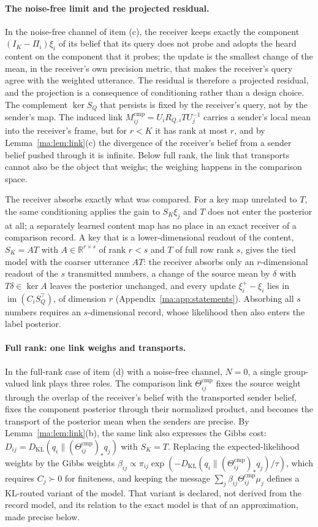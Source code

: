 \documentclass[11pt]{article}
\theoremstyle{definition}
\theoremstyle{remark}
\providecommand{\KL}{D_{\mathrm{KL}}}
\newcommand{\R}{\mathbb R}
\newcommand{\Thcmp}{\Theta^{\mathrm{cmp}}}
\newcommand{\Mcmp}{M^{\mathrm{cmp}}}
\newcommand{\im}{\operatorname{im}}
\begin{document}
\paragraph{The noise-free limit and the projected residual.}
In the noise-free channel of item (c), the receiver keeps exactly the component $(I_K-\Pi_i)\xi_i$ of its belief that its query does not probe and adopts the heard content on the component that it probes; the update is the smallest change of the mean, in the receiver's own precision metric, that makes the receiver's query agree with the weighted utterance. The residual is therefore a projected residual, and the projection is a consequence of conditioning rather than a design choice. The complement $\ker S_Q$ that persists is fixed by the receiver's query, not by the sender's map. The induced link $\Mcmp_{ij}=U_iR_{Q,i}TU_j^{-1}$ carries a sender's local mean into the receiver's frame, but for $r<K$ it has rank at most $r$, and by Lemma~\ref{ma:lem:link}(c) the divergence of the receiver's belief from a sender belief pushed through it is infinite. Below full rank, the link that transports cannot also be the object that weighs; the weighing happens in the comparison space.

The receiver absorbs exactly what was compared. For a key map unrelated to $T$, the same conditioning applies the gain to $S_K\xi_j$ and $T$ does not enter the posterior at all; a separately learned content map has no place in an exact receiver of a comparison record. A key that is a lower-dimensional readout of the content, $S_K=AT$ with $A\in\R^{r\times s}$ of rank $r<s$ and $T$ of full row rank $s$, gives the tied model with the coarser utterance $AT$: the receiver absorbs only an $r$-dimensional readout of the $s$ transmitted numbers, a change of the source mean by $\delta$ with $T\delta\in\ker A$ leaves the posterior unchanged, and every update $\xi_i^+-\xi_i$ lies in $\im(C_iS_Q^\top)$, of dimension $r$ (Appendix~\ref{ma:app:statements}). Absorbing all $s$ numbers requires an $s$-dimensional record, whose likelihood then also enters the label posterior.

\paragraph{Full rank: one link weighs and transports.}
In the full-rank case of item (d) with a noise-free channel, $N=0$, a single group-valued link plays three roles. The comparison link $\Thcmp_{ij}$ fixes the source weight through the overlap of the receiver's belief with the transported sender belief, fixes the component posterior through their normalized product, and becomes the transport of the posterior mean when the senders are precise. By Lemma~\ref{ma:lem:link}(b), the same link also expresses the Gibbs cost: $D_{ij}=\KL(q_i\|(\Thcmp_{ij})_*q_j)$ with $S_K=T$. Replacing the expected-likelihood weights by the Gibbs weights $\beta_{ij}\propto\pi_{ij}\exp(-\KL(q_i\|(\Thcmp_{ij})_*q_j)/\tau)$, which requires $C_j\succ0$ for finiteness, and keeping the message $\sum_j\beta_{ij}\Thcmp_{ij}\mu_j$ defines a KL-routed variant of the model. That variant is declared, not derived from the record model, and its relation to the exact model is that of an approximation, made precise below.
\end{document}
